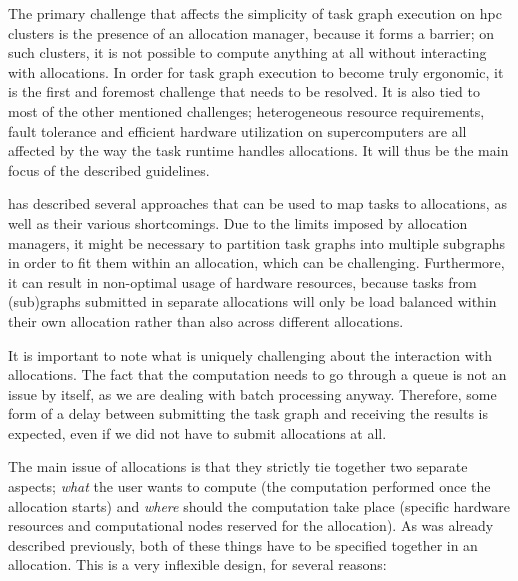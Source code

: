 The primary challenge that affects the simplicity of task graph execution on
\gls{hpc} clusters is the presence of an allocation manager, because it forms a
barrier; on such clusters, it is not possible to compute anything at all without interacting with
allocations. In order for task graph execution to become truly ergonomic, it is the first and
foremost challenge that needs to be resolved. It is also tied to most of the other mentioned
challenges; heterogeneous resource requirements, fault tolerance and efficient hardware utilization
on supercomputers are all affected by the way the task runtime handles allocations. It will thus be
the main focus of the described guidelines.

 has described several approaches that can be used to map tasks to
allocations, as well as their various shortcomings. Due to the limits imposed by allocation
managers, it might be necessary to partition task graphs into multiple subgraphs in order to fit
them within an allocation, which can be challenging. Furthermore, it can result in non-optimal
usage of hardware resources, because tasks from (sub)graphs submitted in separate allocations will
only be load balanced within their own allocation rather than also across different allocations.

It is important to note what is uniquely challenging about the interaction with allocations. The
fact that the computation needs to go through a queue is not an issue by itself, as we are dealing
with batch processing anyway. Therefore, some form of a delay between submitting the task graph and
receiving the results is expected, even if we did not have to submit allocations at all.

The main issue of allocations is that they strictly tie together two separate aspects;
\emph{what} the user wants to compute (the computation performed once the allocation
starts) and \emph{where} should the computation take place (specific hardware resources
and computational nodes reserved for the allocation). As was already described previously, both of
these things have to be specified together in an allocation. This is a very inflexible design, for
several reasons:

